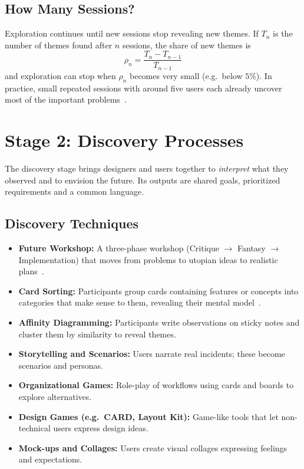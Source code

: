 \documentclass[a4paper,12pt]{article}
\begin{document}
\subsection{How Many Sessions?}
Exploration continues until new sessions stop revealing new themes. If $T_n$ is the number of themes found after $n$ sessions, the share of new themes is
\begin{equation}
    \rho_n = \frac{T_n - T_{n-1}}{T_{n-1}}
\end{equation}
and exploration can stop when $\rho_n$ becomes very small (e.g.\ below $5\%$). In practice, small repeated sessions with around five users each already uncover most of the important problems~\cite{nielsen1993,guest2006}.

\section{Stage 2: Discovery Processes}
The discovery stage brings designers and users together to \emph{interpret} what they observed and to envision the future. Its outputs are shared goals, prioritized requirements and a common language.

\subsection{Discovery Techniques}
\begin{itemize}
    \item \textbf{Future Workshop:} A three-phase workshop (Critique $\rightarrow$ Fantasy $\rightarrow$ Implementation) that moves from problems to utopian ideas to realistic plans~\cite{jungk1987}.
    \item \textbf{Card Sorting:} Participants group cards containing features or concepts into categories that make sense to them, revealing their mental model~\cite{spencer2009}.
    \item \textbf{Affinity Diagramming:} Participants write observations on sticky notes and cluster them by similarity to reveal themes.
    \item \textbf{Storytelling and Scenarios:} Users narrate real incidents; these become scenarios and personas.
    \item \textbf{Organizational Games:} Role-play of workflows using cards and boards to explore alternatives.
    \item \textbf{Design Games (e.g.\ CARD, Layout Kit):} Game-like tools that let non-technical users express design ideas.
    \item \textbf{Mock-ups and Collages:} Users create visual collages expressing feelings and expectations.
\end{itemize}
\end{document}
